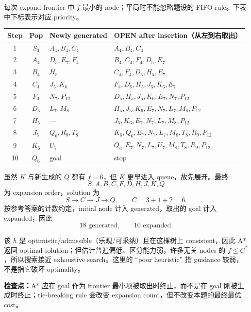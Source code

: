 \begin{checkedsolution}
每次 expand frontier 中 $f$ 最小的 node；平局时不能忽略题设的 FIFO rule。下表中下标表示对应 priority。

\begin{center}
\small
\begin{tabularx}{\textwidth}{@{}cclX@{}}
  \toprule
  Step & Pop & Newly generated & OPEN after insertion（从左到右取出） \\
  \midrule
  1 & $S_3$ & $A_4,B_4,C_4$ & $A_4,B_4,C_4$ \\
  2 & $A_4$ & $D_5,E_7,F_4$ & $B_4,C_4,F_4,D_5,E_7$ \\
  3 & $B_4$ & $H_5$ & $C_4,F_4,D_5,H_5,E_7$ \\
  4 & $C_4$ & $J_5,K_6$ & $F_4,D_5,H_5,J_5,K_6,E_7$ \\
  5 & $F_4$ & $N_7,P_{12}$ & $D_5,H_5,J_5,K_6,E_7,N_7,P_{12}$ \\
  6 & $D_5$ & $L_7,M_8$ & $H_5,J_5,K_6,E_7,N_7,L_7,M_8,P_{12}$ \\
  7 & $H_5$ & --- & $J_5,K_6,E_7,N_7,L_7,M_8,P_{12}$ \\
  8 & $J_5$ & $Q_6,R_9,T_8$ & $K_6,Q_6,E_7,N_7,L_7,M_8,T_8,R_9,P_{12}$ \\
  9 & $K_6$ & $U_7$ & $Q_6,E_7,N_7,L_7,U_7,M_8,T_8,R_9,P_{12}$ \\
  10 & $Q_6$ & goal & stop \\
  \bottomrule
\end{tabularx}
\end{center}

虽然 $K$ 与新生成的 $Q$ 都有 $f=6$，但 $K$ 更早进入 queue，故先展开。最终
\[
  \boxed{S,A,B,C,F,D,H,J,K,Q}
\]
为 expansion order，solution 为
\[
  \boxed{S\to C\to J\to Q},
  \qquad C=3+1+2=\boxed{6}.
\]
按参考答案的计数约定，initial node 计入 generated，取出的 goal 计入 expanded，因此
\[
  \boxed{18\text{ generated}},
  \qquad
  \boxed{10\text{ expanded}}.
\]

该 $h$ 是 optimistic/admissible（乐观/可采纳）且在这棵树上 consistent，因此 A* 返回 optimal solution；但估计普遍偏低、区分能力弱，许多无关 nodes 的 $f\le C^*$，所以搜索接近 exhaustive search。这里的 ``poor heuristic'' 指 guidance 较弱，不是指它破坏 optimality。
\end{checkedsolution}

\textbf{检查点：}A* 应在 goal 作为 frontier 最小项被取出时终止，而不是在 goal 刚被生成时终止；tie-breaking rule 会改变 expansion count，但不改变本题的最终最优 cost。


